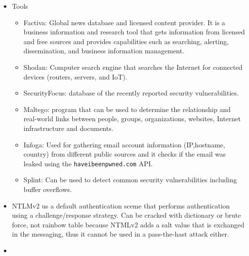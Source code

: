 \begin{itemize}
    \item Tools
    \begin{itemize}
        \item Factiva: Global news database and licensed content provider. It is a business information and research tool that gets information from licensed and free sources and provides capabilities such as searching, alerting, dissemination, and business information management.
        \item Shodan: Computer search engine that searches the Internet for connected devices (routers, servers, and IoT).
        \item SecurityFocus: database of the recently reported security vulnerabilities.
        \item Maltego: program that can be used to determine the relationship and real-world links between people, groups, organizations, websites, Internet infrastructure and documents.
        \item Infoga: Used for gathering email account information (IP,hostname, country) from different public sources and it checks if the email was leaked using the \verb|haveibeenpwned.com| API.
        \item Splint: Can be used to detect common security vulnerabilities including buffer overflows.
    \end{itemize}
    \item NTLMv2 us a default authentication sceme that performs authentication using a challenge/response strategy. Can be cracked with dictionary or brute force, not rainbow table because NTMLv2 adds a salt value that is exchanged in the messaging, thus it cannot be used in a pass-the-hast attack either.
    \item 
\end{itemize}

